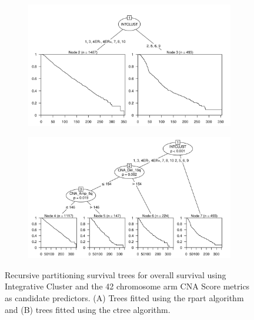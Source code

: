 \begin{figure}[!htb]
\centering

\vspace{0.5cm}

\begin{subfigure}{\textwidth}
\subcaption{}
\includegraphics[width=1\textwidth]{../figures/Appendices/Appendix_B/PA_PartyKit_Survival_Score_OS_INTCLUST.png}
\end{subfigure}

\vspace{2cm}

\begin{subfigure}{\textwidth}
\subcaption{}
\includegraphics[width=1\textwidth]{../figures/Appendices/Appendix_B/PA_Ctree_Survival_Score_OS_INTCLUST.png}
\end{subfigure}

\vspace{0.5cm}

\caption[Recursive partitioning survival trees for overall survival using Integrative Cluster and the 42 chromosome arm CNA Score metrics as candidate predictors.]{Recursive partitioning survival trees for overall survival using Integrative Cluster and the 42 chromosome arm CNA Score metrics as candidate predictors. (A) Trees fitted using the rpart algorithm and (B) trees fitted using the ctree algorithm.}
\end{figure}

